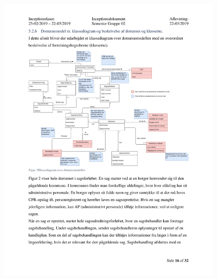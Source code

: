 \begin{figure}[hb]
  \includegraphics[scale = 0.33]{./PNG/Inceptions/Gruppe02+InceptionsDokument-17.jpg} 
\end{figure}

